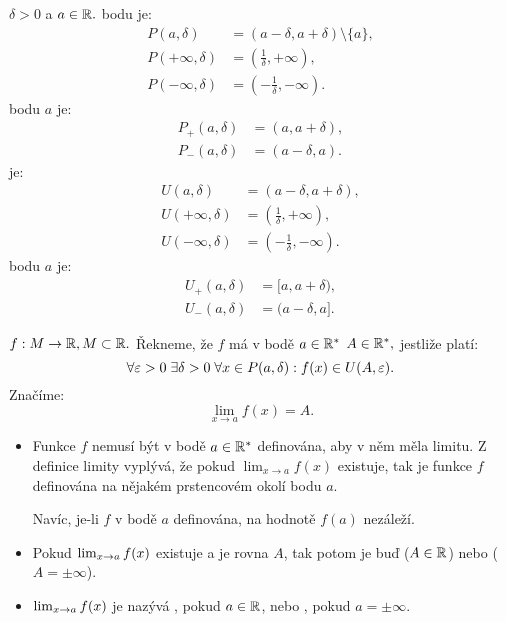 \begin{definition}
    \Necht $\delta > 0$ a $a \in \mathbb{R}.$  bodu je:
    \begin{align*}
        P(a, \delta) &= (a - \delta, a+ \delta) \setminus \{a\}, \\
        P(+\infty, \delta) &= (\frac{1}{\delta}, +\infty),\\
        P(-\infty, \delta) &= (-\frac{1}{\delta}, -\infty).
    \end{align*}
     bodu $a$ je:
    \begin{align*}
        P_+(a, \delta) &= (a, a+\delta), \\
        P_-(a, \delta) &= (a-\delta, a).
    \end{align*}
     je: 
    \begin{align*}
        U(a, \delta) &= (a - \delta, a+ \delta), \\
        U(+\infty, \delta) &= (\frac{1}{\delta}, +\infty),\\
        U(-\infty, \delta) &= (-\frac{1}{\delta}, -\infty).
    \end{align*}
     bodu $a$ je:
    \begin{align*}
        U_+(a, \delta) &= [a, a+\delta), \\
        U_-(a, \delta) &= (a-\delta, a].
    \end{align*}
\end{definition}

\begin{definition}
    \Necht $f:M \rightarrow \mathbb{R}, M \subset \mathbb{R}.$ Řekneme, že $f$ má v bodě $a \in 
    \mathbb{R}^*$  $A \in \mathbb{R}^*,$ jestliže platí:
    $$\forall \varepsilon > 0 \; \exists \delta > 0 \; \forall x \in P(a,\delta): f(x) \in U(A,\varepsilon).$$
    Značíme:
    $$\lim_{x\to a} f(x) = A.$$
\end{definition}

\begin{remark}
    \leavevmode
    \begin{itemize}
        \item Funkce $f$ nemusí být v bodě $a \in \mathbb{R}^*$ definována, aby v něm
            měla limitu. Z definice limity vyplývá, že pokud $\lim_{x\to a} f(x)$
            existuje, tak je funkce $f$ definována na nějakém prstencovém okolí
            bodu $a.$

            Navíc, je-li $f$ v bodě $a$ definována, na hodnotě $f(a)$ nezáleží.
        \item Pokud $\lim_{x \to a} f(x)$ existuje a je rovna $A$, tak potom je
            buď  ($A \in \mathbb{R}$) nebo 
            ($A = \pm \infty$).

        \item $\lim_{x \to a} f(x)$ je nazývá ,
            pokud $a \in \mathbb{R}$, nebo ,
            pokud $a = \pm \infty.$
    \end{itemize}
\end{remark}

